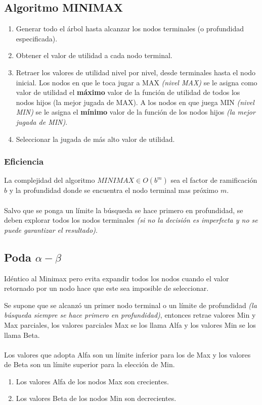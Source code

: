 \documentclass[tikz,11pt,fleqn]{book} %
\begin{document}
\subsection{Algoritmo MINIMAX}
\begin{enumerate}
    \item Generar todo el árbol hasta alcanzar los nodos terminales (o profundidad especificada).
    \item Obtener el valor de utilidad a cada nodo terminal.
    \item Retraer los valores de utilidad nivel por nivel, desde terminales hasta el nodo inicial. Los nodos en que le toca jugar a MAX \textit{(nivel MAX)} se le asigna como valor de utilidad el \textbf{máximo} valor de la función de utilidad de todos los nodos hijos (la mejor jugada de MAX). A los nodos en que juega MIN \textit{(nivel MIN)} se le asigna el \textbf{mínimo} valor de la función de los nodos hijos \textit{(la mejor jugada de MIN)}.
    \item Seleccionar la jugada de más alto valor de utilidad.
\end{enumerate}

\subsubsection{Eficiencia}
La complejidad del algoritmo $MINIMAX\in O(b^m)$ sea el factor de ramificación $b$ y la profundidad donde se encuentra el nodo terminal mas próximo $m$.
\\\\
Salvo que se ponga un límite la búsqueda se hace primero en profundidad, se deben explorar todos los nodos terminales \textit{(si no la decisión es imperfecta y no se puede garantizar el resultado)}.

\subsection{Poda $\alpha-\beta$}
Idéntico al Minimax pero evita expandir todos los nodos cuando el valor
retornado por un nodo hace que este sea imposible de seleccionar.

Se supone que se alcanzó un primer nodo terminal o un límite de profundidad\textit{ (la búsqueda siempre se hace primero en profundidad)}, entonces retrae valores Min y Max parciales, los valores parciales Max se los llama Alfa y los valores Min se los llama Beta.
\\\\
Los valores que adopta Alfa son un límite inferior para los de Max y los valores de Beta son un límite superior para la elección de Min.
\begin{enumerate}
    \item Los valores Alfa de los nodos Max son crecientes.
    \item Los valores Beta de los nodos Min son decrecientes.
\end{enumerate}
\end{document}
